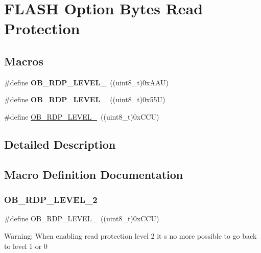 \hypertarget{group___f_l_a_s_h_ex___option___bytes___read___protection}{}\section{F\+L\+A\+SH Option Bytes Read Protection}
\label{group___f_l_a_s_h_ex___option___bytes___read___protection}
\subsection*{Macros}
\begin{DoxyCompactItemize}
\item 
\mbox{\label{group___f_l_a_s_h_ex___option___bytes___read___protection_ga22c7871bda267a2844ab9ca9f7bd38e4}} 
\#define {\bfseries O\+B\+\_\+\+R\+D\+P\+\_\+\+L\+E\+V\+E\+L\+\_}~((uint8\+\_\+t)0x\+A\+A\+U)
\item 
\mbox{\label{group___f_l_a_s_h_ex___option___bytes___read___protection_ga778207f0d12d87bbff9d55e985aba5bc}} 
\#define {\bfseries O\+B\+\_\+\+R\+D\+P\+\_\+\+L\+E\+V\+E\+L\+\_}~((uint8\+\_\+t)0x55\+U)
\item 
\#define \mbox{\hyperlink{group___f_l_a_s_h_ex___option___bytes___read___protection_ga2262afca565429ce2808d835c49e5ee6}{O\+B\+\_\+\+R\+D\+P\+\_\+\+L\+E\+V\+E\+L\+\_}}~((uint8\+\_\+t)0x\+C\+C\+U)
\end{DoxyCompactItemize}


\subsection{Detailed Description}


\subsection{Macro Definition Documentation}
\mbox{\label{group___f_l_a_s_h_ex___option___bytes___read___protection_ga2262afca565429ce2808d835c49e5ee6}} 
\subsubsection{\texorpdfstring{OB\_RDP\_LEVEL\_2}{OB\_RDP\_LEVEL\_2}}
{\footnotesize\ttfamily \#define O\+B\+\_\+\+R\+D\+P\+\_\+\+L\+E\+V\+E\+L\+\_~((uint8\+\_\+t)0x\+C\+C\+U)}

Warning\+: When enabling read protection level 2 it s no more possible to go back to level 1 or 0 
